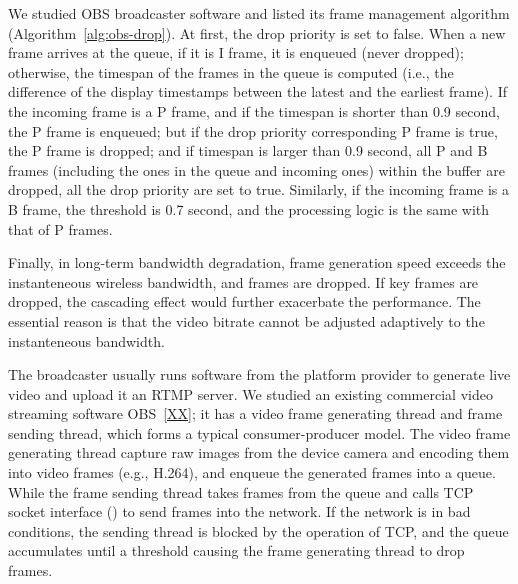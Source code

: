 We studied OBS broadcaster software and listed its frame management algorithm (Algorithm~\ref{alg:obs-drop}). At first, the drop priority is set to false. When a new frame arrives at the queue, if it is I frame, it is enqueued (never dropped); otherwise, the timespan of the frames in the queue is computed (i.e., the difference of the display timestamps between the latest and the earliest frame). If the incoming frame is a P frame, and if the timespan is shorter than 0.9 second, the P frame is enqueued; but if the drop priority corresponding P frame is true, the P frame is dropped; and if timespan is larger than 0.9 second, all P and B frames (including the ones in the queue and incoming ones) within the buffer are dropped, all the drop priority are set to true. Similarly, if the incoming frame is a B frame, the threshold is 0.7 second, and the processing logic is the same with that of P frames.

Finally, in long-term bandwidth degradation, frame generation speed exceeds the instanteneous wireless bandwidth, and frames are dropped. If key frames are dropped, the cascading effect would further exacerbate the performance. The essential reason is that the video bitrate cannot be adjusted adaptively to the instanteneous bandwidth.

\iffalse

The broadcaster usually runs software from the platform provider to generate live video and upload it an RTMP server. We studied an existing commercial video streaming software OBS~\ref{XX}; it has a video frame generating thread and frame sending thread, which forms a typical consumer-producer model. The video frame generating thread capture raw images from the device camera and encoding them into video frames (e.g., H.264), and enqueue the generated frames into a queue. While the frame sending thread takes frames from the queue and calls TCP socket interface (\mywrite) to send frames into the network. If the network is in bad conditions, the sending thread is blocked by the \mywrite operation of TCP, and the queue accumulates until a threshold causing the frame generating thread to drop frames.


